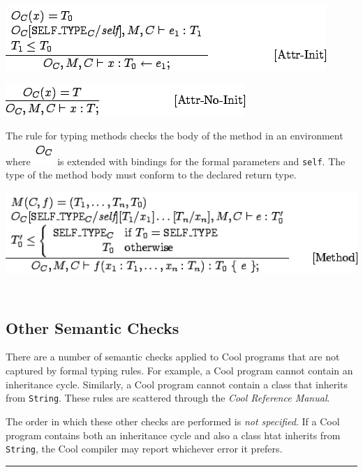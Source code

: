 \documentclass[]{article}
\begin{document}
\includegraphics{img112.png}

\includegraphics{img113.png}

The rule for typing methods checks the body of the method in an
environment where \includegraphics{img109.png} is extended with bindings
for the formal parameters and \texttt{self}. The type of the method body
must conform to the declared return type.

\includegraphics{img114.png}

\subsection{\\ Other Semantic Checks}

There are a number of semantic checks applied to Cool programs that are
not captured by formal typing rules. For example, a Cool program cannot
contain an inheritance cycle. Similarly, a Cool program cannot contain a
class that inherits from \texttt{String}. These rules are scattered
through the \emph{Cool Reference Manual}.

The order in which these other checks are performed is \emph{not
specified}. If a Cool program contains both an inheritance cycle and
also a class htat inherits from \texttt{String}, the Cool compiler may
report whichever error it prefers.

\begin{center}\rule{3in}{0.4pt}\end{center}
\end{document}
